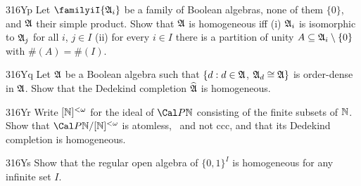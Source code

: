 {\spheader 316Yp
Let $\familyiI{\frak A_i}$ be a family of Boolean algebras,
none of them $\{0\}$, and $\frak A$ their simple product.   Show that
$\frak A$ is homogeneous iff (i) $\frak A_i$ is isomorphic to $\frak A_j$
for all $i$, $j\in I$ (ii) for every $i\in I$ there is a partition of
unity $A\subseteq\frak A_i\setminus\{0\}$ with $\#(A)=\#(I)$.

\spheader 316Yq Let $\frak A$ be a Boolean algebra such that
$\{d:d\in\frak A$, $\frak A_d\cong\frak A\}$ is order-dense in $\frak A$.
Show that the Dedekind completion $\widehat{\frak A}$ is homogeneous.

\spheader 316Yr Write $[\Bbb N]^{<\omega}$ for the ideal of
$\Cal P\Bbb N$ consisting of the finite subsets of $\Bbb N$.   Show that
$\Cal P\Bbb N/[\Bbb N]^{<\omega}$ is atomless, \wsid\ and not ccc,
and that its Dedekind completion is homogeneous.

\spheader 316Ys
Show that the regular open algebra of $\{0,1\}^I$ is
homogeneous for any infinite set $I$.

}%

